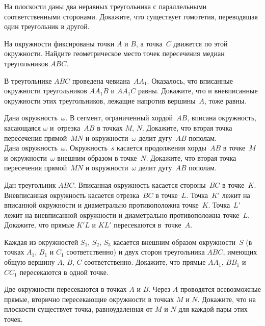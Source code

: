 \begin{problems}

\item
На плоскости даны два неравных треугольника с параллельными соответственными
сторонами.
Докажите, что существует гомотетия, переводящая один треугольник в другой.

\item
На окружности фиксированы точки $A$ и $B$, а точка~$C$ движется по этой
окружности.
Найдите геометрическое место точек пересечения медиан треугольников $ABC$.

\item
В треугольнике $ABC$ проведена чевиана~$A A_1$.
Оказалось, что вписанные окружности треугольников $A A_1 B$ и $A A_1 C$ равны.
Докажите, что и вневписанные окружности этих треугольников, лежащие напротив
вершины~$A$, тоже равны.

\item
\sp
Дана окружность~$\omega$.
В сегмент, ограниченный хордой~$AB$, вписана окружность, касающаяся $\omega$
и~отрезка~$AB$ в точках $M$, $N$.
Докажите, что вторая точка пересечения прямой~$MN$ и окружности~$\omega$ делит
дугу~$AB$ пополам.
\\
\sp
Дана окружность~$\omega$.
Окружность~$s$ касается продолжения хорды~$AB$ в точке~$M$
и окружности~$\omega$ внешним образом в точке~$N$.
Докажите, что вторая точка пересечения прямой~$MN$ и окружности~$\omega$ делит
дугу~$AB$ пополам.

\item
Дан треугольник $ABC$.
Вписанная окружность касается стороны~$BC$ в точке~$K$.
Вневписанная окружность касается отрезка~$BC$ в точке~$L$.
Точка~$K'$ лежит на вписанной окружности и диаметрально противоположна
точке~$K$.
Точка~$L'$ лежит на вневписанной окружности и диаметрально противоположна
точке~$L$.
Докажите, что прямые $K'L$ и $KL'$ пересекаются в~точке~$A$.

\item
Каждая из окружностей $S_1$, $S_2$, $S_3$ касается внешним образом
окружности~$S$ (в точках $A_1$, $B_1$ и $C_1$ соответственно) и двух сторон
треугольника $ABC$, имеющих общую вершину $A$, $B$, $C$ соответственно.
Докажите, что прямые $A A_1$, $B B_1$ и $C C_1$ пересекаются в одной точке.

\item
Две окружности пересекаются в точках $A$ и $B$.
Через $A$ проводятся всевозможные прямые, вторично пересекающие окружности
в точках $M$ и $N$.
Докажите, что на плоскости существует точка, равноудаленная от $M$ и $N$ для
каждой пары этих точек.


\end{problems}
